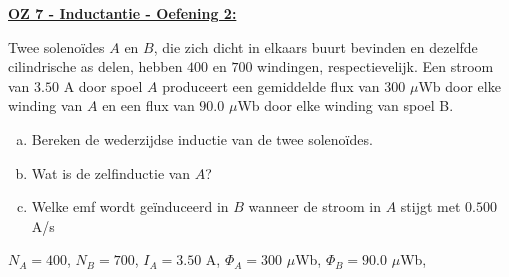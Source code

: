 \textbf{\underline{OZ 7 - Inductantie - Oefening 2:}}
\vspace{0.5cm}

Twee solenoïdes $A$ en $B$, die zich dicht in elkaars buurt bevinden en dezelfde cilindrische as delen, hebben $400$ en $700$ windingen, respectievelijk. Een stroom van $3.50$ A door spoel $A$ produceert een gemiddelde flux van $300$ $\mu$Wb door elke winding van $A$ en een flux van $90.0$ $\mu$Wb door elke winding van spoel B. 

\begin{enumerate}[(a)]
    \item Bereken de wederzijdse inductie van de twee solenoïdes.
    \item Wat is de zelfinductie van $A$?
    \item Welke emf wordt geïnduceerd in $B$ wanneer de stroom in $A$ stijgt met $0.500$ A/s
\end{enumerate}


\begin{description}[labelwidth=1.5cm, leftmargin=!]
    \item[Geg. :] $N_A = 400$, $N_B = 700$, $I_A = 3.50$ A, $\Phi_{A} = 300$ $\mu$Wb, $\Phi_{B} = 90.0$ $\mu$Wb, 
\end{description}

